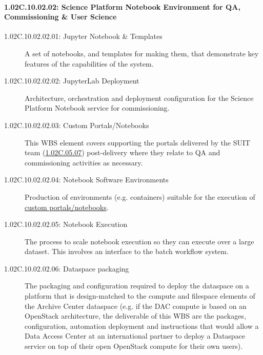 \paragraph*{1.02C.10.02.02: Science Platform Notebook Environment for QA, Commissioning \& User Science}

\begin{description}

\item[1.02C.10.02.02.01: Jupyter Notebook \& Templates]
  A set of notebooks, and templates for making them, that demonstrate key
  features of the capabilities of the system.

\item[1.02C.10.02.02.02: JupyterLab Deployment]
  Architecture, orchestration and deployment configuration for the Science
  Platform Notebook service for commissioning.

\item[1.02C.10.02.02.03: Custom Portals/Notebooks]
  \label{wbs:1.02C.10.02.02.03}
  This WBS element covers supporting the portals delivered by the SUIT team
  (\hyperref[wbs:1.02C.05.08]{1.02C.05.07}) post-delivery where they relate to
  QA and commissioning activities as necessary.

\item[1.02C.10.02.02.04: Notebook Software Environments]
  \label{wbs:1.02C.10.02.02.04}
  Production of environments (e.g. containers) suitable for the execution of
  \hyperref[wbs:1.02C.10.02.02.03]{custom portals/notebooks}.

\item[1.02C.10.02.02.05: Notebook Execution]
  The process to scale notebook execution so they can execute over a large
  dataset. This involves an interface to the batch workflow system.

\item[1.02C.10.02.02.06: Dataspace packaging]
  The packaging and configuration required to deploy the dataspace on a
  platform that is design-matched to the compute and filespace elements of the
  Archive Center dataspace (e.g. if the DAC compute is based on an OpenStack
  architecture, the deliverable of this WBS are the packages, configuration,
  automation deployment and instructions that would allow a Data Access Center
  at an international partner to deploy a Dataspace service on top of their
  open OpenStack compute for their own users).

\end{description}
